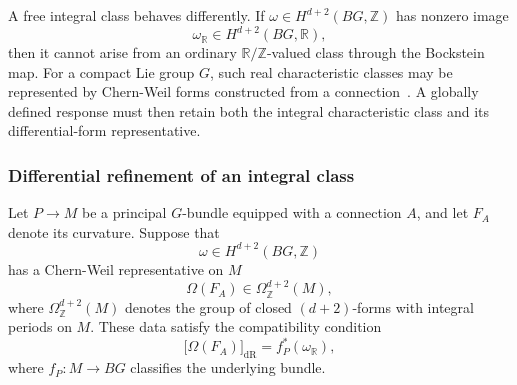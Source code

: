 \documentclass[aps,prx,reprint,superscriptaddress,twocolumn,amsmath,amssymb,amsfonts, nofootinbib]{revtex4-2}
\theoremstyle{apsstyle}
\begin{document}
\bigskip 

A free integral class behaves differently. If $\omega\in H^{d+2}(BG,\mathbb Z)$ has nonzero image
\begin{equation*}
    \omega_{\mathbb R}
    \in
    H^{d+2}(BG,\mathbb R),
\end{equation*}
then it cannot arise from an ordinary $\mathbb R/\mathbb Z$-valued class through the Bockstein map. For a compact Lie group $G$, such real characteristic classes may be represented by Chern-Weil forms constructed from a connection~\cite{ChernSimons1974,CheegerSimons1985}. A globally defined response must then retain both the integral characteristic class and its differential-form representative.

\subsubsection{Differential refinement of an integral class}

Let $P\to M$ be a principal $G$-bundle equipped with a connection $A$,
and let $F_A$ denote its curvature. Suppose that
\begin{equation*}
    \omega\in H^{d+2}(BG,\mathbb Z)
\end{equation*}
has a Chern-Weil representative on $M$
\begin{equation*}
    \Omega(F_A)\in\Omega_{\mathbb Z}^{d+2}(M),
\end{equation*}
where $\Omega_{\mathbb Z}^{d+2}(M)$ denotes the group of closed
$(d+2)$-forms with integral periods on $M$. These data satisfy the
compatibility condition
\begin{equation}
    \bigl[\Omega(F_A)\bigr]_{\mathrm{dR}}
    =
    f_P^*(\omega_{\mathbb R}),
    \label{eq:differential_refinement_compatibility}
\end{equation}
where $f_P:M\to BG$ classifies the underlying bundle.
\end{document}
